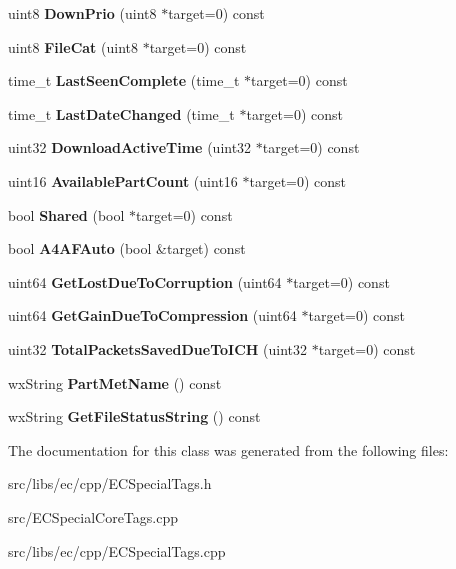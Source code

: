 \begin{DoxyCompactItemize}
\item 
uint8 {\bfseries DownPrio} (uint8 $\ast$target=0) const \label{classCEC__PartFile__Tag_a57b0a34f95c9fe0975a5f63ae14e13f2}

\item 
uint8 {\bfseries FileCat} (uint8 $\ast$target=0) const \label{classCEC__PartFile__Tag_ab2b4fce7d3c469a148abf659135d4772}

\item 
time\_\-t {\bfseries LastSeenComplete} (time\_\-t $\ast$target=0) const \label{classCEC__PartFile__Tag_a0c9f4cd2749e40c5f1ec729fefe7031d}

\item 
time\_\-t {\bfseries LastDateChanged} (time\_\-t $\ast$target=0) const \label{classCEC__PartFile__Tag_ac3dd58329d17e7bf8f0e531301ff9ae8}

\item 
uint32 {\bfseries DownloadActiveTime} (uint32 $\ast$target=0) const \label{classCEC__PartFile__Tag_ac92fd15f661b00ec6c279d7386d6a47e}

\item 
uint16 {\bfseries AvailablePartCount} (uint16 $\ast$target=0) const \label{classCEC__PartFile__Tag_a2403e3609bb7844593d311a744778709}

\item 
bool {\bfseries Shared} (bool $\ast$target=0) const \label{classCEC__PartFile__Tag_a8e06c340a32ab2f70660270221d44403}

\item 
bool {\bfseries A4AFAuto} (bool \&target) const \label{classCEC__PartFile__Tag_ab4baf25afdc338ef1ec93cd8b69ef97a}

\item 
uint64 {\bfseries GetLostDueToCorruption} (uint64 $\ast$target=0) const \label{classCEC__PartFile__Tag_a1bd4130100de8d189c8d7bd04145faa9}

\item 
uint64 {\bfseries GetGainDueToCompression} (uint64 $\ast$target=0) const \label{classCEC__PartFile__Tag_aa4dcd9022271d488ab88eb010d9551a0}

\item 
uint32 {\bfseries TotalPacketsSavedDueToICH} (uint32 $\ast$target=0) const \label{classCEC__PartFile__Tag_a122907f9ecfc1a76c6a9b97f560b7648}

\item 
wxString {\bfseries PartMetName} () const \label{classCEC__PartFile__Tag_a5d4f77292bbbbf822f9a750aba3f5364}

\item 
wxString {\bfseries GetFileStatusString} () const \label{classCEC__PartFile__Tag_a84279278e0c10c7f1bc2db2228c3479e}

\end{DoxyCompactItemize}


The documentation for this class was generated from the following files:\begin{DoxyCompactItemize}
\item 
src/libs/ec/cpp/ECSpecialTags.h\item 
src/ECSpecialCoreTags.cpp\item 
src/libs/ec/cpp/ECSpecialTags.cpp\end{DoxyCompactItemize}
